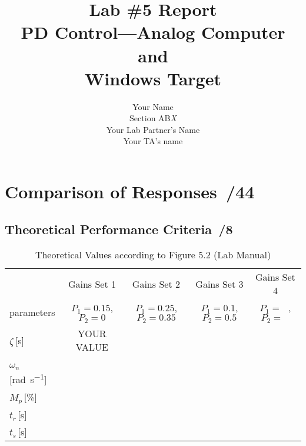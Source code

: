 \documentclass{article}
\newcommand{\score}{\hfill \underline{\hspace{0.65cm}}\,/} %
\begin{document}
\title{\bf Lab \#5 Report\\{\sc PD Control---Analog Computer and \\ Windows Target}}
\author{Your Name\\ Section AB\emph{X}\\
Your Lab Partner's Name\\
Your TA's name}
\maketitle

\noindent {}

\section{Comparison of Responses  \score 44}
\subsection{Theoretical Performance Criteria \score 8}
\begin{table}[phtb]\footnotesize 
\begin{center}
\caption{Theoretical Values according to Figure 5.2 (Lab Manual)}
\label{tbl:lab5_q1_1}
\begin{tabular}{l|m{1.2cm}|m{1.2cm}|m{1.2cm}|m{1.2cm}|m{1.2cm}|m{1.2cm}|m{1.2cm}|m{1.2cm}} \hline \hline
\cellcolor{lightgray} & \multicolumn{2}{c|}{\cellcolor{lightgray}Gains Set 1} & \multicolumn{2}{c|}{\cellcolor{lightgray}Gains Set 2} & \multicolumn{2}{c|}{\cellcolor{lightgray}Gains Set 3} & \multicolumn{2}{c}{\cellcolor{lightgray}Gains Set 4}\\ \cline{2-9}
\multirow{-2}{*}{\cellcolor{lightgray}parameters}& \multicolumn{2}{c|}{$P_1 = 0.15$, $P_2 = 0$}& \multicolumn{2}{c|}{$P_1 = 0.25$, $P_2 = 0.35$}& \multicolumn{2}{c|}{$P_1 = 0.1$, $P_2 = 0.5$}& \multicolumn{2}{c}{$P_1 = ~~~$, $P_2 = ~~~$}\\ \hline
$\zeta$\,[\si{\second}] & \multicolumn{2}{c|}{YOUR VALUE} & \multicolumn{2}{c|}{} & \multicolumn{2}{c|}{} & \multicolumn{2}{c}{} \\ \hline
$\omega_n$\,[\si{\radian\per\second}] & \multicolumn{2}{c|}{} & \multicolumn{2}{c|}{} & \multicolumn{2}{c|}{} & \multicolumn{2}{c}{} \\ \hline
$M_p$\,[\%]& \multicolumn{2}{c|}{} & \multicolumn{2}{c|}{~} & \multicolumn{2}{c|}{~} & \multicolumn{2}{c}{~} \\ \hline
$t_r$\,[\si{\second}] & \multicolumn{2}{c|}{} & \multicolumn{2}{c|}{} & \multicolumn{2}{c|}{} & \multicolumn{2}{c}{} \\ \hline
$t_s$\,[\si{\second}] & \multicolumn{2}{c|}{} & \multicolumn{2}{c|}{} & \multicolumn{2}{c|}{} & \multicolumn{2}{c}{} \\ \hline
\end{tabular}
\end{center}
\end{table}
\end{document}
